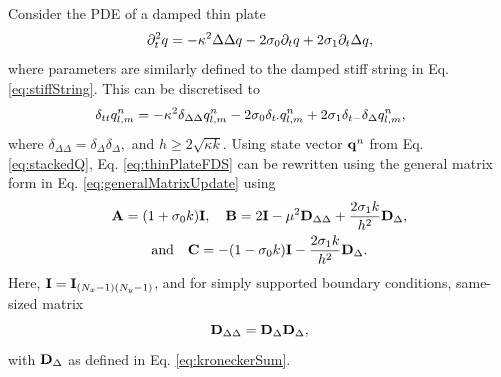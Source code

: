 \documentclass[fleqn]{jaes}
\begin{document}
Consider the PDE of a damped thin plate \cite{Morse1968, Bilbao2009}
\begin{equation}\label{eq:thinPlatePDE}
    \ptt q = -\kappa^2\Delta\Delta q -2\sigma_0\pt q +2\sigma_1\pt\Delta q,
\end{equation}
where parameters are similarly defined to the damped stiff string in Eq. \eqref{eq:stiffString}. This can be discretised to 
\begin{equation}\label{eq:thinPlateFDS}
    \!\!\!\!\!\!\!\!\dtt\qlmn = -\kappa^2\delta_{\Delta\Delta}\qlmn-2\sigma_0\dtd \qlmn +2\sigma_1\dtm\dDelta \qlmn,
\end{equation}
where $\delta_{\Delta\Delta} = \delta_{\Delta}\delta_{\Delta},$ and $h \geq 2\sqrt{\kappa k}$. 
Using state vector $\mathbf{q}^n$ from Eq. \eqref{eq:stackedQ}, Eq. \eqref{eq:thinPlateFDS} can be rewritten using the general matrix form in Eq. \eqref{eq:generalMatrixUpdate} using
\begin{equation}\label{eq:thinPlateMats}
\begin{gathered}
    \A = (1+\sigma_0k)\I, \quad \B = 2\I - \mu^2 \DDeltaDelta + \frac{2\sigma_1k}{h^2}\DDeltamat,\\
    \text{and} \quad\C = -(1-\sigma_0k)\I - \frac{2\sigma_1k}{h^2}\DDeltamat.
    \end{gathered}
\end{equation}
Here, $\mathbf{I} = \mathbf{I}_{(N_x-1)(N_y-1)}$, and for simply supported boundary conditions, same-sized matrix
\begin{equation}\label{eq:DDeltaDelta}
    \DDeltaDelta = \DDeltamat\DDeltamat,
\end{equation}
with $\mathbf{D}_\Delta$ as defined in Eq. \eqref{eq:kroneckerSum}.
\end{document}
